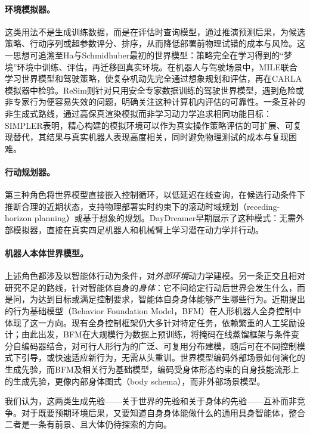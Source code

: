\paragraph{环境模拟器。}
这类用法不是生成训练数据，而是在评估时查询模型，通过推演预测后果，为候选策略、行动序列或超参数评分、排序，从而降低部署前物理试错的成本与风险。这一思想可追溯至Ha与Schmidhuber最初的世界模型：策略完全在学习得到的“梦境”环境中训练、评估，再迁移回真实环境\citep{ha2018worldmodels}。在机器人与驾驶场景中，MILE联合学习世界模型和驾驶策略，使复杂机动先完全通过想象规划和评估，再在CARLA模拟器中检验\citep{hu2022mile}。ReSim则针对只用安全专家数据训练的驾驶世界模型，遇到危险或非专家行为便容易失效的问题，明确关注这种计算机内评估的可靠性\citep{yang2025resim}。一条互补的非生成式路线，通过高保真渲染模拟而非学习动力学追求相同功能目标：SIMPLER表明，精心构建的模拟环境可以作为真实操作策略评估的可扩展、可复现替代，其结果与真实机器人表现高度相关，同时避免物理测试的成本与复现困难\citep{li2024simpler}。

\paragraph{行动规划器。}
第三种角色将世界模型直接嵌入控制循环，以低延迟在线查询，在候选行动条件下推断合理的近期状态，支持物理部署实时约束下的滚动时域规划（receding-horizon planning）或基于想象的规划。DayDreamer早期展示了这种模式：无需外部模拟器，直接在真实四足机器人和机械臂上学习潜在动力学并行动\citep{wu2022daydreamer}。

\paragraph{机器人本体世界模型。}
上述角色都涉及以智能体行动为条件，对\emph{外部环境}动力学建模。另一条正交且相对研究不足的路线，针对智能体自身的\emph{身体}：它不问给定行动后世界会发生什么，而是问，为达到目标或满足控制要求，智能体自身身体能够产生哪些行为。近期提出的行为基础模型（Behavior Foundation Model，BFM）在人形机器人全身控制中体现了这一方向\citep{zeng2025bfm}。现有全身控制框架仍大多针对特定任务，依赖繁重的人工奖励设计；由此出发，BFM在大规模行为数据上预训练，将掩码在线蒸馏框架与条件变分自编码器结合，对可行人形行为的广泛、可复用分布建模，随后可在不同控制模式下引导，或快速适应新行为，无需从头重训。世界模型编码外部场景如何演化的生成先验，而BFM及相关行为基础模型，编码受身体形态约束的自身技能流形上的生成先验，更像内部身体图式（body schema），而非外部场景模型。

我们认为，这两类生成先验——关于世界的先验和关于身体的先验——互补而非竞争。对于既要预期环境后果，又要知道自身身体能做什么的通用具身智能体，整合二者是一条有前景、且大体仍待探索的方向。


